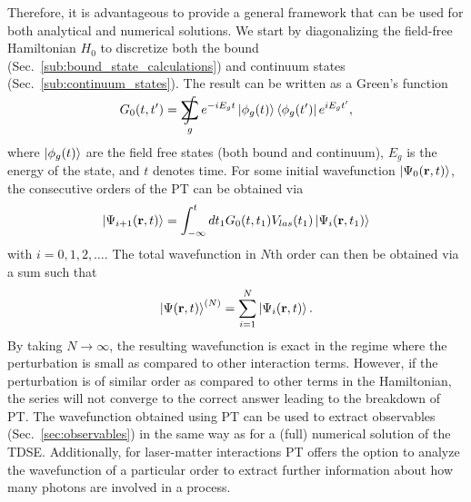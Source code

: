 Therefore, it is advantageous to provide a general framework that can be used for both analytical and numerical solutions. We start by diagonalizing the field-free Hamiltonian $H_0$ to discretize both the bound (Sec.~\ref{sub:bound_state_calculations}) and continuum states (Sec.~\ref{sub:continuum_states}). The result can be written as a Green's function 
\begin{equation}
\label{eq:pt_green_func}
    G_0(t,t') = \SumInt_g e^{-iE_g t}\ket{\phi_g(t)}\bra{\phi_g(t')} e^{iE_g t'},
\end{equation}
where $\ket{\phi_g(t)}$ are the field free states (both bound and continuum), $E_g$ is the energy of the state, and $t$ denotes time. For some initial wavefunction $\ket{\Psi_0(\mathbf{r},t)}$, the consecutive orders of the PT can be obtained via
\begin{equation}
    \ket{\Psi_{i+1}(\mathbf{r},t)} = \int_{-\infty}^t dt_1 G_0(t,t_1)V_{las}(t_1)\ket{\Psi_i(\mathbf{r},t_1)} 
\end{equation}
with $i = 0, 1, 2, \ldots$.
The total wavefunction in $N$th order can then be obtained via a sum such that 
\begin{equation}
    \ket{\Psi(\mathbf{r},t)}^{(N)} = \sum_{i=1}^N \ket{\Psi_{i}(\mathbf{r},t)}.
\end{equation}
By taking $N \rightarrow \infty$, the resulting wavefunction is exact in the regime where the perturbation is small as compared to other interaction terms. However, if the perturbation is of similar order as compared to other terms in the Hamiltonian, the series will not converge to the correct answer leading to the breakdown of PT. The wavefunction obtained using PT can be used to extract observables (Sec.~\ref{sec:observables}) in the same way as for a (full) numerical solution of the TDSE. Additionally, for laser-matter interactions PT offers the option to analyze the wavefunction of a particular order to extract further information about how many photons are involved in a process. 

